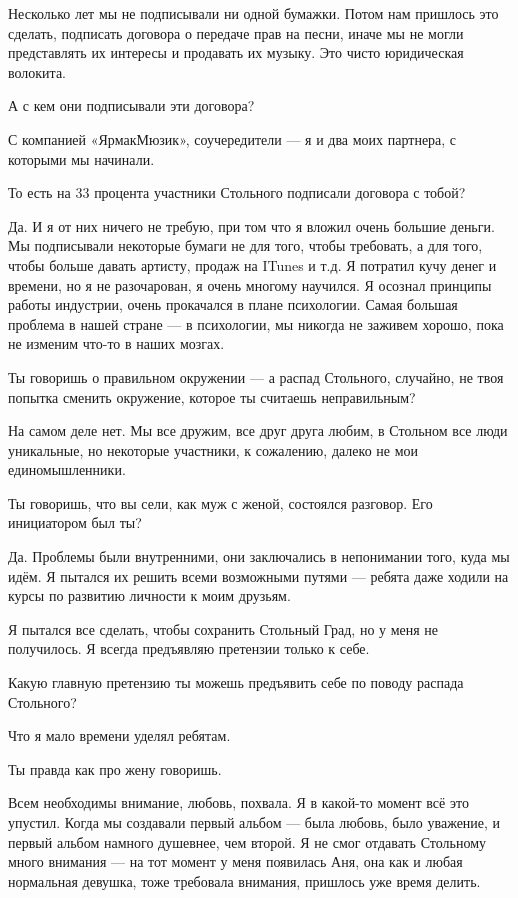 Несколько лет мы не подписывали ни одной бумажки. Потом нам пришлось это
сделать, подписать договора о передаче прав на песни, иначе мы не могли
представлять их интересы и продавать их музыку. Это чисто юридическая волокита.

А с кем они подписывали эти договора?

С компанией «ЯрмакМюзик», соучередители --- я и два моих партнера, с которыми мы
начинали.

То есть на 33 процента участники Стольного подписали договора с тобой?

Да. И я от них ничего не требую, при том что я вложил очень большие деньги. Мы
подписывали некоторые бумаги не для того, чтобы требовать, а для того, чтобы
больше давать артисту, продаж на ITunes и т.д. Я потратил кучу денег и времени,
но я не разочарован, я очень многому научился. Я осознал принципы работы
индустрии, очень прокачался в плане психологии. Самая большая проблема в нашей
стране --- в психологии, мы никогда не заживем хорошо, пока не изменим что-то в
наших мозгах.

Ты говоришь о правильном окружении --- а распад Стольного, случайно, не твоя
попытка сменить окружение, которое ты считаешь неправильным?

На самом деле нет. Мы все дружим, все друг друга любим, в Стольном все люди
уникальные, но некоторые участники, к сожалению, далеко не мои единомышленники.

Ты говоришь, что вы сели, как муж с женой, состоялся разговор. Его инициатором
был ты?

Да. Проблемы были внутренними, они заключались в непонимании того, куда мы
идём. Я пытался их решить всеми возможными путями --- ребята даже ходили на курсы
по развитию личности к моим друзьям.

Я пытался все сделать, чтобы сохранить Стольный Град, но у меня не получилось.
Я всегда предъявляю претензии только к себе.

Какую главную претензию ты можешь предъявить себе по поводу распада Стольного?

Что я мало времени уделял ребятам.

Ты правда как про жену говоришь.

Всем необходимы внимание, любовь, похвала. Я в какой-то момент всё это упустил.
Когда мы создавали первый альбом --- была любовь, было уважение, и первый альбом
намного душевнее, чем второй. Я не смог отдавать Стольному много внимания --- на
тот момент у меня появилась Аня, она как и любая нормальная девушка, тоже
требовала внимания, пришлось уже время делить.


